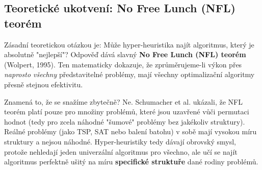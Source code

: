 \documentclass[12pt,a4paper]{article}
\theoremstyle{definition}
\begin{document}
\subsection{Teoretické ukotvení: No Free Lunch (NFL) teorém}
Zásadní teoretickou otázkou je: Může hyper-heuristika najít algoritmus, který je absolutně "nejlepší"? Odpověď dává slavný \textbf{No Free Lunch (NFL) teorém} (Wolpert, 1995). Ten matematicky dokazuje, že zprůměrujeme-li výkon přes \textit{naprosto všechny} představitelné problémy, mají všechny optimalizační algoritmy přesně stejnou efektivitu. 

Znamená to, že se snažíme zbytečně? Ne. Schumacher et al. ukázali, že NFL teorém platí pouze pro množiny problémů, které jsou uzavřené vůči permutaci hodnot (tedy pro zcela náhodné "šumové" problémy bez jakékoliv struktury). Reálné problémy (jako TSP, SAT nebo balení batohu) v sobě mají vysokou míru struktury a nejsou náhodné. Hyper-heuristiky tedy dávají obrovský smysl, protože nehledají jeden univerzální algoritmus pro všechno, ale učí se najít algoritmus perfektně ušitý na míru \textbf{specifické struktuře} dané rodiny problémů.
\end{document}
